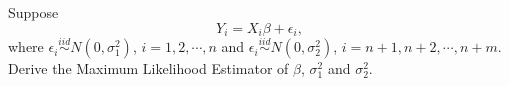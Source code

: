 \documentclass[12pt]{article}
\begin{document}
%
%

{
Suppose $$Y_i = X_i\beta + \epsilon_i,$$ where $\epsilon_i \stackrel{iid}{\sim} N(0, \sigma_1^2)$, $i=1, 2, \cdots, n$ and $\epsilon_i \stackrel{iid}{\sim} N(0, \sigma_2^2)$, $i=n+1, n+2, \cdots, n+m$. Derive the Maximum Likelihood Estimator of $\beta$, $\sigma_1^2$ and $\sigma_2^2$.
}
{

\vfill
 \newpage

}
{
}

\problemsdone
\end{document}
